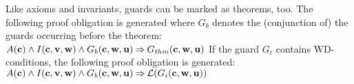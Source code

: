 Like axioms and invariants, guards can be marked as theorems, too. The following
proof obligation is generated where $G_b$ denotes the (conjunction of) the guards occurring before the theorem:
%
{$A(\textbf{c}) \land I(\textbf{c},\textbf{v},\textbf{w}) \land G_b(\textbf{c},\textbf{w},\textbf{u}) 
\mathbin\Rightarrow G_{thm}(\textbf{c},\textbf{w},\textbf{u})$}
If the guard $G_i$ contains WD-conditions, the following proof obligation is generated:
%
{$A(\textbf{c}) \land I(\textbf{c},\textbf{v},\textbf{w}) \land G_b(\textbf{c},\textbf{w},\textbf{u}) 
\mathbin\Rightarrow \mathcal{L}(G_i(\textbf{c},\textbf{w},\textbf{u}))$}

